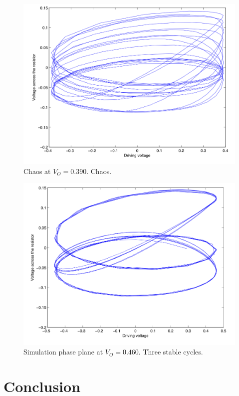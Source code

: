 \documentclass[12pt]{report}
\begin{document}
	\begin{figure}
		\centering
		\includegraphics{simulations/plotnu0390.png}
		\caption{Chaos at $V_{O}=0.390$. Chaos.}
		\label{fig:sim.0390}
	\end{figure}

	\begin{figure}
		\centering
		\includegraphics{simulations/plotnu0460.png}
		\caption{Simulation phase plane at $V_{O}=0.460$. Three stable cycles.}
		\label{fig:sim.0460}
	\end{figure}




\chapter{Conclusion}
\label{ch:Conclusion}
\end{document}
